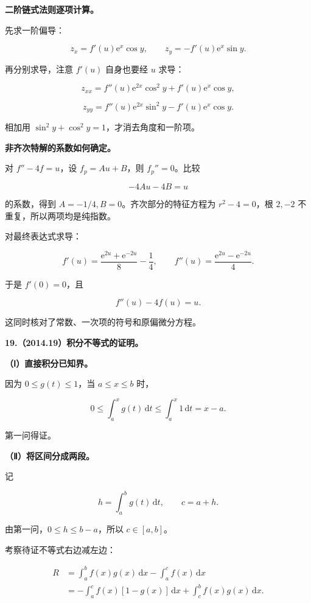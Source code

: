 \documentclass[UTF8,11pt,fontset=windows]{ctexart}
\begin{document}
\textbf{二阶链式法则逐项计算。}

先求一阶偏导：

$$
z_x=f'(u)\mathrm e^x\cos y,
\qquad z_y=-f'(u)\mathrm e^x\sin y.
$$

再分别求导，注意 $f'(u)$ 自身也要经 $u$ 求导：

$$
z_{xx}=f''(u)\mathrm e^{2x}\cos^2y+f'(u)\mathrm e^x\cos y,
$$

$$
z_{yy}=f''(u)\mathrm e^{2x}\sin^2y-f'(u)\mathrm e^x\cos y.
$$

相加用 $\sin^2y+\cos^2y=1$，才消去角度和一阶项。

\textbf{非齐次特解的系数如何确定。}

对 $f''-4f=u$，设 $f_p=Au+B$，则 $f_p''=0$。比较

$$
-4Au-4B=u
$$

的系数，得到 $A=-1/4,B=0$。齐次部分的特征方程为 $r^2-4=0$，根 $2,-2$ 不重复，所以两项均是纯指数。

对最终表达式求导：

$$
f'(u)=\frac{\mathrm e^{2u}+\mathrm e^{-2u}}8-\frac14,
\qquad
f''(u)=\frac{\mathrm e^{2u}-\mathrm e^{-2u}}4.
$$

于是 $f'(0)=0$，且

$$
f''(u)-4f(u)=u.
$$

这同时核对了常数、一次项的符号和原偏微分方程。

\clearpage

\textbf{19.（2014.19）积分不等式的证明。}

\textbf{（Ⅰ）直接积分已知界。}

因为 $0\le g(t)\le1$，当 $a\le x\le b$ 时，

$$
0\le\int_a^xg(t)\,\mathrm dt\le\int_a^x1\,\mathrm dt=x-a.
$$

第一问得证。

\textbf{（Ⅱ）将区间分成两段。}

记

$$
h=\int_a^b g(t)\,\mathrm dt,\qquad c=a+h.
$$

由第一问，$0\le h\le b-a$，所以 $c\in[a,b]$。

考察待证不等式右边减左边：

$$
\begin{aligned}
R&=\int_a^b f(x)g(x)\,\mathrm dx-\int_a^c f(x)\,\mathrm dx\\
&=-\int_a^c f(x)[1-g(x)]\,\mathrm dx+\int_c^b f(x)g(x)\,\mathrm dx.
\end{aligned}
$$
\end{document}

